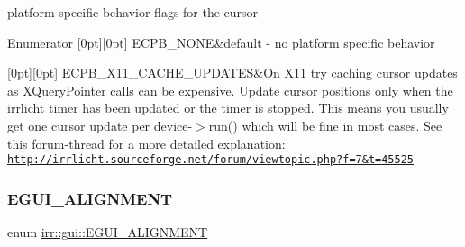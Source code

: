 platform specific behavior flags for the cursor 

\begin{DoxyEnumFields}{Enumerator}
[0pt][0pt]{}\mbox{\label{namespaceirr_1_1gui_abbd186f9cfba2f805d98248df226acefaea42899f7236957b21660fd74dda283d}} 
E\+C\+P\+B\+\_\+\+N\+O\+NE&default -\/ no platform specific behavior \\
\hline

[0pt][0pt]{}\mbox{\label{namespaceirr_1_1gui_abbd186f9cfba2f805d98248df226acefa462d7a82478e4b89a31c15fdb20bd16e}} 
E\+C\+P\+B\+\_\+\+X11\+\_\+\+C\+A\+C\+H\+E\+\_\+\+U\+P\+D\+A\+T\+ES&On X11 try caching cursor updates as X\+Query\+Pointer calls can be expensive. Update cursor positions only when the irrlicht timer has been updated or the timer is stopped. This means you usually get one cursor update per device-\/$>$run() which will be fine in most cases. See this forum-\/thread for a more detailed explanation\+: \href{http://irrlicht.sourceforge.net/forum/viewtopic.php?f=7&t=45525}{\tt http\+://irrlicht.\+sourceforge.\+net/forum/viewtopic.\+php?f=7\&t=45525} \\
\hline

\end{DoxyEnumFields}
\mbox{\label{namespaceirr_1_1gui_a19eb5fb40e67f108cb16aba922ddaa2d}} 
\subsubsection{\texorpdfstring{E\+G\+U\+I\+\_\+\+A\+L\+I\+G\+N\+M\+E\+NT}{EGUI\_ALIGNMENT}}
{\footnotesize\ttfamily enum \hyperlink{namespaceirr_1_1gui_a19eb5fb40e67f108cb16aba922ddaa2d}{irr\+::gui\+::\+E\+G\+U\+I\+\_\+\+A\+L\+I\+G\+N\+M\+E\+NT}}

